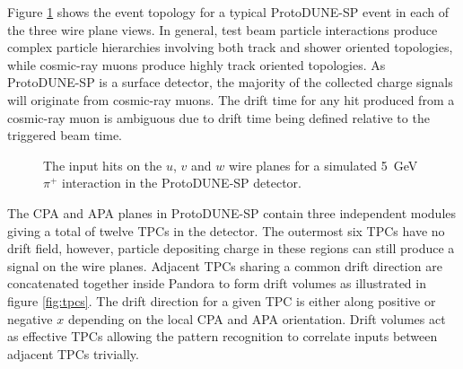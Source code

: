 Figure \ref{fig:inputhits} shows the event topology for a typical ProtoDUNE-SP event in each of the three wire plane views.  In general, test beam particle interactions produce complex particle hierarchies involving both track and shower oriented topologies, while cosmic-ray muons produce highly track oriented topologies.  As ProtoDUNE-SP is a surface detector, the majority of the collected charge signals will originate from cosmic-ray muons.  The drift time for any hit produced from a cosmic-ray muon is ambiguous due to drift time being defined relative to the triggered beam time.

\begin{figure}
\centering
{}
\caption{The input hits on the \protect{} $u$, \protect{} $v$ and \protect{} $w$ wire planes for a simulated 5~GeV $\pi^{+}$ interaction in the ProtoDUNE-SP detector.}
\label{fig:inputhits}
\end{figure}

The CPA and APA planes in ProtoDUNE-SP contain three independent modules giving a total of twelve TPCs in the detector.  The outermost six TPCs have no drift field, however, particle depositing charge in these regions can still produce a signal on the wire planes.  Adjacent TPCs sharing a common drift direction are concatenated together inside Pandora to form drift volumes as illustrated in figure \ref{fig:tpcs}.  The drift direction for a given TPC is either along positive or negative $x$ depending on the local CPA and APA orientation.  Drift volumes act as effective TPCs allowing the pattern recognition to correlate inputs between adjacent TPCs trivially.

